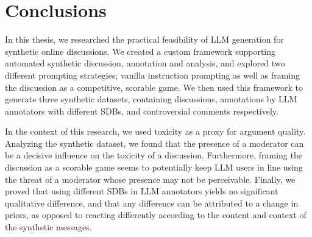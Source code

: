 %
\chapter{Conclusions}
\label{sec:conclusions}

In this thesis, we researched the practical feasibility of LLM generation for synthetic online discussions. We created a custom framework supporting automated synthetic discussion, annotation and analysis, and explored two different prompting strategies; vanilla instruction prompting as well as framing the discussion as a competitive, scorable game. We then used this framework to generate three synthetic datasets, containing discussions, annotations by LLM annotators with different \acp{SDB}, and controversial comments respectively. 

In the context of this research, we used toxicity as a proxy for argument quality. Analyzing the synthetic dataset, we found that the presence of a moderator can be a decisive influence on the toxicity of a discussion. Furthermore, framing the discussion as a scorable game seems to potentially keep LLM users in line using the threat of a moderator whose presence may not be perceivable. Finally, we proved that using different SDBs in LLM annotators yields no significant qualitative difference, and that any difference can be attributed to a change in priors, as opposed to reacting differently according to the content and context of the synthetic messages.

